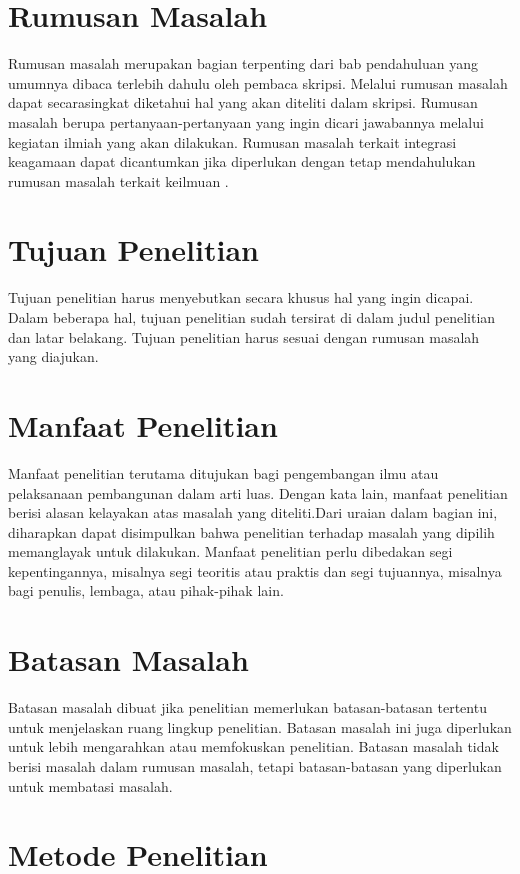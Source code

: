 \section{Rumusan Masalah}

Rumusan masalah merupakan bagian terpenting dari bab pendahuluan yang umumnya dibaca terlebih dahulu oleh pembaca skripsi. Melalui rumusan masalah dapat secarasingkat diketahui hal yang akan diteliti dalam skripsi. Rumusan masalah berupa pertanyaan-pertanyaan yang ingin dicari jawabannya melalui kegiatan ilmiah yang akan dilakukan. Rumusan masalah terkait integrasi keagamaan dapat dicantumkan jika diperlukan dengan tetap mendahulukan rumusan masalah terkait keilmuan \cite{Curtain03}.
\section{Tujuan Penelitian}

Tujuan penelitian harus menyebutkan secara khusus hal yang ingin dicapai. Dalam beberapa hal, tujuan penelitian sudah tersirat di dalam judul penelitian dan latar belakang. Tujuan penelitian harus sesuai dengan rumusan masalah yang diajukan.
\section{Manfaat Penelitian}

Manfaat penelitian terutama ditujukan bagi pengembangan ilmu atau pelaksanaan pembangunan dalam arti luas. Dengan kata lain, manfaat penelitian berisi alasan kelayakan atas masalah yang diteliti.Dari uraian dalam bagian ini, diharapkan dapat disimpulkan bahwa penelitian terhadap masalah yang dipilih memanglayak untuk dilakukan. Manfaat penelitian perlu dibedakan segi kepentingannya, misalnya segi teoritis atau praktis dan segi tujuannya, misalnya bagi penulis, lembaga, atau pihak-pihak lain.
\section{Batasan Masalah}

Batasan masalah dibuat jika penelitian memerlukan batasan-batasan tertentu untuk menjelaskan ruang lingkup penelitian. Batasan masalah ini juga diperlukan untuk lebih mengarahkan atau memfokuskan penelitian. Batasan masalah tidak berisi masalah dalam rumusan masalah, tetapi batasan-batasan yang diperlukan untuk membatasi masalah.
\section{Metode Penelitian}

